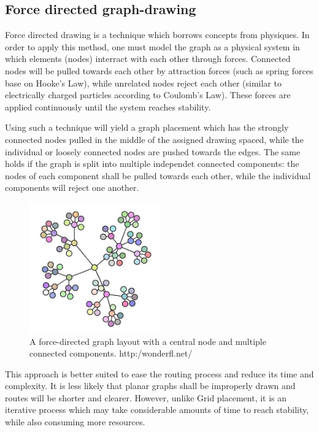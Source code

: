 \subsection{Force directed graph-drawing}

Force directed drawing is a technique which borrows concepts from physiques. In order to apply this method, one must model the graph as a 
physical system in which elements (nodes) interract with each other through forces. Connected nodes will be pulled towards each other by 
attraction forces (such as spring forces base on Hooke's Law), while unrelated nodes reject each other (similar to electrically charged particles
according to Coulomb's Law). These forces are applied continuously until the system reaches stability.

Using such a technique will yield a graph placement which has the strongly connected nodes pulled in the middle of the assigned drawing spaced, while the 
individual or loosely connected nodes are pushed towards the edges. The same holds if the graph is split into multiple independet connected components: 
the nodes of each component shall be pulled towards each other, while the individual components will reject one another.

\begin{figure}[ht] \centering
\includegraphics[width=0.5\textwidth]{img/algdesing/force_directed_example.jpg}
\caption{A force-directed graph layout with a central node and multiple connected components.  http:/wonderfl.net/} \end{figure}

This approach is better suited to ease the routing process and reduce its time and complexity. It is less likely that planar graphs shall be 
improperly drawn and routes will be shorter and clearer. However, unlike Grid placement, it is an iterative process which may take considerable 
amounts of time to reach stability, while also consuming more resources.

